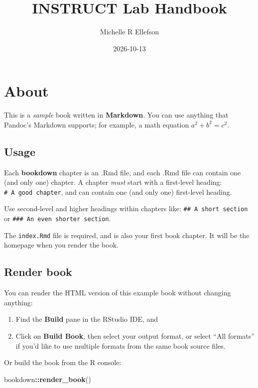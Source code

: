 \documentclass[
]{book}
\title{INSTRUCT Lab Handbook}
\author{Michelle R Ellefson}
\date{2026-10-13}
\newenvironment{Shaded}{\begin{snugshade}}{\end{snugshade}}
\newcommand{\FunctionTok}[1]{\textcolor[rgb]{0.13,0.29,0.53}{\textbf{#1}}}
\newcommand{\NormalTok}[1]{#1}
\newcommand{\SpecialCharTok}[1]{\textcolor[rgb]{0.81,0.36,0.00}{\textbf{#1}}}
\theoremstyle{definition}
\theoremstyle{definition}
\theoremstyle{definition}
\theoremstyle{definition}
\theoremstyle{remark}
\begin{document}
\maketitle

{
\setcounter{tocdepth}{1}
\tableofcontents
}
\chapter{About}\label{about}

This is a \emph{sample} book written in \textbf{Markdown}. You can use anything that Pandoc's Markdown supports; for example, a math equation \(a^2 + b^2 = c^2\).

\section{Usage}\label{usage}

Each \textbf{bookdown} chapter is an .Rmd file, and each .Rmd file can contain one (and only one) chapter. A chapter \emph{must} start with a first-level heading: \texttt{\#\ A\ good\ chapter}, and can contain one (and only one) first-level heading.

Use second-level and higher headings within chapters like: \texttt{\#\#\ A\ short\ section} or \texttt{\#\#\#\ An\ even\ shorter\ section}.

The \texttt{index.Rmd} file is required, and is also your first book chapter. It will be the homepage when you render the book.

\section{Render book}\label{render-book}

You can render the HTML version of this example book without changing anything:

\begin{enumerate}
\def\labelenumi{\arabic{enumi}.}
\item
  Find the \textbf{Build} pane in the RStudio IDE, and
\item
  Click on \textbf{Build Book}, then select your output format, or select ``All formats'' if you'd like to use multiple formats from the same book source files.
\end{enumerate}

Or build the book from the R console:

\begin{Shaded}
\begin{Highlighting}[]
\NormalTok{bookdown}\SpecialCharTok{::}\FunctionTok{render\_book}\NormalTok{()}
\end{Highlighting}
\end{Shaded}
\end{document}
